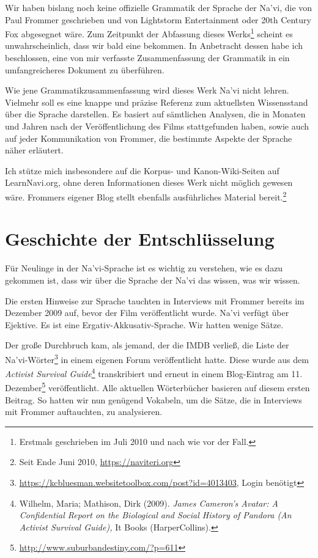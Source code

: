 
Wir haben bislang noch keine offizielle Grammatik der Sprache der Na'vi, die von Paul Frommer geschrieben und von Lightstorm Entertainment oder 20th Century Fox abgesegnet wäre. Zum Zeitpunkt der Abfassung dieses Werks\footnote{Erstmals geschrieben im Juli 2010 und nach wie vor der Fall.} scheint es unwahrscheinlich, dass wir bald eine bekommen. In Anbetracht dessen habe ich beschlossen, eine von mir verfasste Zusammenfassung der Grammatik in ein umfangreicheres Dokument zu überführen.

Wie jene Grammatikzusammenfassung wird dieses Werk Na'vi nicht lehren. Vielmehr soll es eine knappe und präzise Referenz zum aktuellsten Wissensstand über die Sprache darstellen. Es basiert auf sämtlichen Analysen, die in Monaten und Jahren nach der Veröffentlichung des Films stattgefunden haben, sowie auch auf jeder Kommunikation von Frommer, die bestimmte Aspekte der Sprache näher erläutert.

Ich stütze mich insbesondere auf die Korpus- und Kanon-Wiki-Seiten auf LearnNavi.org, ohne deren Informationen dieses Werk nicht möglich gewesen wäre. Frommers eigener Blog stellt ebenfalls ausführliches Material bereit.\footnote{Seit Ende Juni 2010, \url{https://naviteri.org}}

\section{Geschichte der Entschlüsselung}

\noindent Für Neulinge in der Na'vi-Sprache ist es wichtig zu verstehen, wie es dazu gekommen ist, dass wir über die Sprache der Na'vi das wissen, was wir wissen.

Die ersten Hinweise zur Sprache tauchten in Interviews mit Frommer bereits im Dezember 2009 auf, bevor der Film veröffentlicht wurde. Na'vi verfügt über Ejektive. Es ist eine Ergativ-Akkusativ-Sprache. Wir hatten wenige Sätze.

Der große Durchbruch kam, als jemand, der die IMDB verließ, die Liste der Na'vi-Wörter\footnote{\url{https://kcbluesman.websitetoolbox.com/post?id=4013403}, Login benötigt} in einem eigenen Forum veröffentlicht hatte. Diese wurde aus dem \textit{Activist Survival Guide}\footnote{Wilhelm, Maria; Mathison, Dirk (2009). \textit{James Cameron's Avatar: A Confidential Report on the Biological and Social History of Pandora (An Activist Survival Guide),} It Books (HarperCollins).} transkribiert und erneut in einem Blog-Eintrag am 11. Dezember\footnote{\url{http://www.suburbandestiny.com/?p=611}} veröffentlicht. Alle aktuellen Wörterbücher basieren auf diesem ersten Beitrag. So hatten wir nun genügend Vokabeln, um die Sätze, die in Interviews mit Frommer auftauchten, zu analysieren.


